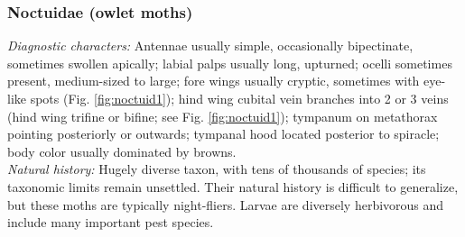 \documentclass[letterpaper, 11pt]{article}
\begin{document}
\subsubsection{Noctuidae (owlet moths)}
\noindent{}\textit{Diagnostic characters:} Antennae usually simple, occasionally bipectinate, sometimes swollen apically; labial palps usually long, upturned; ocelli sometimes present, medium-sized to large; fore wings usually cryptic, sometimes with eye-like spots (Fig. \ref{fig:noctuid1}); hind wing cubital vein branches into 2 or 3 veins (hind wing trifine or bifine; see Fig. \ref{fig:noctuid1}); tympanum on metathorax pointing posteriorly or outwards; tympanal hood located posterior to spiracle; body color usually dominated by browns.\\

\noindent{}\textit{Natural history:} Hugely diverse taxon, with tens of thousands of species; its taxonomic limits remain unsettled. Their natural history is difficult to generalize, but these moths are typically night-fliers. Larvae are diversely herbivorous and include many important pest species.
\end{document}
